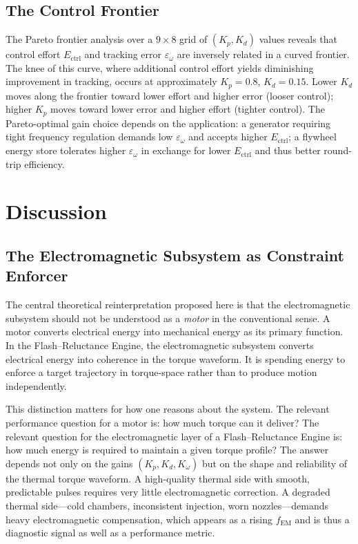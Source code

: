 \documentclass[11pt, a4paper]{article}
\theoremstyle{plain}
\theoremstyle{definition}
\newcommand{\Ectrl}{E_{\mathrm{ctrl}}}
\newcommand{\om}{\omega}
\begin{document}
\subsection{The Control Frontier}

The Pareto frontier analysis over a $9 \times 8$ grid of $(K_p, K_d)$ values reveals that control effort $\Ectrl$ and tracking error $\varepsilon_\om$ are inversely related in a curved frontier. The knee of this curve, where additional control effort yields diminishing improvement in tracking, occurs at approximately $K_p = 0.8$, $K_d = 0.15$. Lower $K_d$ moves along the frontier toward lower effort and higher error (looser control); higher $K_p$ moves toward lower error and higher effort (tighter control). The Pareto-optimal gain choice depends on the application: a generator requiring tight frequency regulation demands low $\varepsilon_\om$ and accepts higher $\Ectrl$; a flywheel energy store tolerates higher $\varepsilon_\om$ in exchange for lower $\Ectrl$ and thus better round-trip efficiency.

\section{Discussion}
\label{sec:discussion}

\subsection{The Electromagnetic Subsystem as Constraint Enforcer}

The central theoretical reinterpretation proposed here is that the electromagnetic subsystem should not be understood as a \textit{motor} in the conventional sense. A motor converts electrical energy into mechanical energy as its primary function. In the Flash--Reluctance Engine, the electromagnetic subsystem converts electrical energy into coherence in the torque waveform. It is spending energy to enforce a target trajectory in torque-space rather than to produce motion independently.

This distinction matters for how one reasons about the system. The relevant performance question for a motor is: how much torque can it deliver? The relevant question for the electromagnetic layer of a Flash--Reluctance Engine is: how much energy is required to maintain a given torque profile? The answer depends not only on the gains $(K_p, K_d, K_\om)$ but on the shape and reliability of the thermal torque waveform. A high-quality thermal side with smooth, predictable pulses requires very little electromagnetic correction. A degraded thermal side---cold chambers, inconsistent injection, worn nozzles---demands heavy electromagnetic compensation, which appears as a rising $f_{\mathrm{EM}}$ and is thus a diagnostic signal as well as a performance metric.
\end{document}
